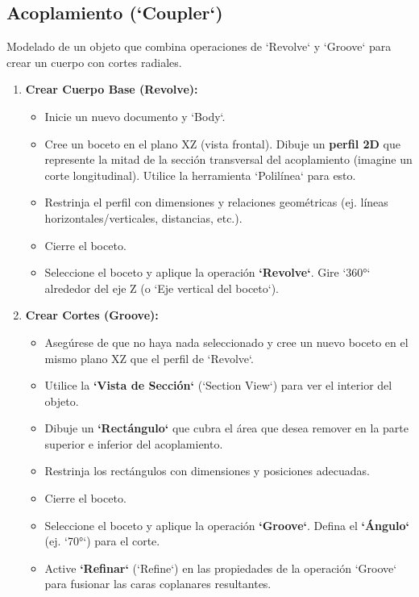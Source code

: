 \documentclass[12pt]{article}
\begin{document}
\subsection{Acoplamiento (`Coupler`)}
Modelado de un objeto que combina operaciones de `Revolve` y `Groove` para crear un cuerpo con cortes radiales.
\begin{enumerate}[label=\arabic*)]
    \item \textbf{Crear Cuerpo Base (Revolve):}
    \begin{itemize}[label=\textendash]
        \item Inicie un nuevo documento y `Body`.
        \item Cree un boceto en el plano XZ (vista frontal). Dibuje un \textbf{perfil 2D} que represente la mitad de la sección transversal del acoplamiento (imagine un corte longitudinal). Utilice la herramienta `Polilínea` para esto.
        \item Restrinja el perfil con dimensiones y relaciones geométricas (ej. líneas horizontales/verticales, distancias, etc.).
        \item Cierre el boceto.
        \item Seleccione el boceto y aplique la operación \textbf{`Revolve`}. Gire `360°` alrededor del eje Z (o `Eje vertical del boceto`).
    \end{itemize}
    \item \textbf{Crear Cortes (Groove):}
    \begin{itemize}[label=\textendash]
        \item Asegúrese de que no haya nada seleccionado y cree un nuevo boceto en el mismo plano XZ que el perfil de `Revolve`.
        \item Utilice la \textbf{`Vista de Sección`} (`Section View`) para ver el interior del objeto.
        \item Dibuje un \textbf{`Rectángulo`} que cubra el área que desea remover en la parte superior e inferior del acoplamiento.
        \item Restrinja los rectángulos con dimensiones y posiciones adecuadas.
        \item Cierre el boceto.
        \item Seleccione el boceto y aplique la operación \textbf{`Groove`}. Defina el \textbf{`Ángulo`} (ej. `70°`) para el corte.
        \item Active \textbf{`Refinar`} (`Refine`) en las propiedades de la operación `Groove` para fusionar las caras coplanares resultantes.
    \end{itemize}
\end{enumerate}
\end{document}
